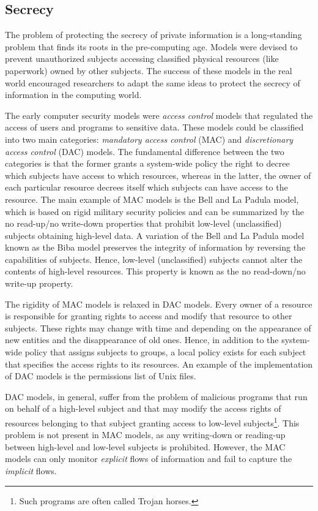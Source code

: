 \documentclass[10pt,a4paper,final,oneside,fleqn]{book}
\begin{document}
\subsection{Secrecy} The problem of protecting the secrecy of private information is a long-standing problem that finds its roots in the pre-computing age.  Models were devised to prevent unauthorized subjects accessing classified physical resources (like paperwork) owned by other subjects.  The success of these models in the real world encouraged researchers to adapt the same ideas to protect the secrecy of information in the computing world.

The early computer security models were {\itshape access control\/} models that regulated the access of users and programs to sensitive data.  These models could be classified into two main categories: {\itshape mandatory access control\/} (MAC) and {\itshape discretionary access control\/} (DAC) models.  The fundamental difference between the two categories is that the former grants a system-wide policy the right to decree which subjects have access to which resources, whereas in the latter, the owner of each particular resource decrees itself which subjects can have access to the resource.  The main example of MAC models is the Bell and La Padula \cite{bell1} model, which is based on rigid military security policies and can be summarized by the no read-up/no write-down properties that prohibit low-level (unclassified) subjects obtaining high-level data.  A variation of the Bell and La Padula model known as the Biba model \cite{biba1} preserves the integrity of information by reversing the capabilities of subjects.  Hence, low-level (unclassified) subjects cannot alter the contents of high-level resources.  This property is known as the no read-down/no write-up property.

The rigidity of MAC models is relaxed in DAC models.  Every owner of a resource is responsible for granting rights to access and modify that resource to other subjects.  These rights may change with time and depending on the appearance of new entities and the disappearance of old ones.  Hence, in addition to the system-wide policy that assigns subjects to groups, a local policy exists for each subject that specifies the access rights to its resources.  An example of the implementation of DAC models is the permissions list of Unix files.

DAC models, in general, suffer from the problem of malicious programs that run on behalf of a high-level subject and that may modify the access rights of resources belonging to that subject granting access to low-level subjects\footnote{Such programs are often called Trojan horses.}.  This problem is not present in MAC models, as any writing-down or reading-up between high-level and low-level subjects is prohibited.  However, the MAC models can only monitor {\itshape explicit\/} flows of information and fail to capture the {\itshape implicit\/} flows.
\end{document}
